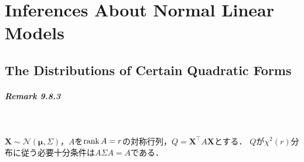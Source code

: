 \chapter{Inferences About Normal Linear Models}
\setcounter{section}{7}
\section{The Distributions of Certain Quadratic Forms}
\paragraph{Remark 9.8.3}~
\begin{screen}
  \(\boldsymbol{X} \sim \mathcal{N}(\boldsymbol\mu, \Sigma)\)，\(A\)を\(\operatorname{rank} A = r\)の対称行列，\(Q = \boldsymbol{X}^\top A \boldsymbol{X}\)とする．
  \(Q\)が\(\chi^2(r)\)分布に従う必要十分条件は\(A\Sigma A = A\)である．
\end{screen}
